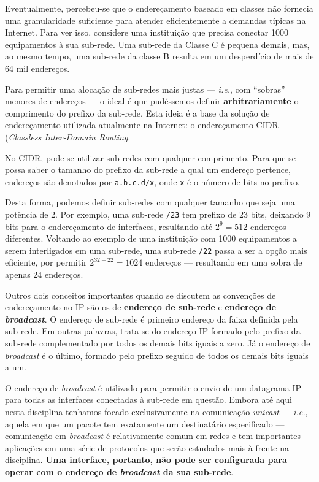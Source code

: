 \documentclass{article}
\begin{document}
Eventualmente, percebeu-se que o endereçamento baseado em classes não fornecia uma granularidade suficiente para atender eficientemente a demandas típicas na Internet. Para ver isso, considere uma instituição que precisa conectar 1000 equipamentos à sua sub-rede. Uma sub-rede da Classe C é pequena demais, mas, ao mesmo tempo, uma sub-rede da classe B resulta em um desperdício de mais de 64 mil endereços.

Para permitir uma alocação de sub-redes mais justas --- \textit{i.e.}, com ``sobras'' menores de endereços --- o ideal é que pudéssemos definir \textbf{arbitrariamente} o comprimento do prefixo da sub-rede. Esta ideia é a base da solução de endereçamento utilizada atualmente na Internet: o endereçamento CIDR (\textit{Classless Inter-Domain Routing}.

No CIDR, pode-se utilizar sub-redes com qualquer comprimento. Para que se possa saber o tamanho do prefixo da sub-rede a qual um endereço pertence, endereços são denotados por \texttt{a.b.c.d/x}, onde \texttt{x} é o número de bits no prefixo.

Desta forma, podemos definir sub-redes com qualquer tamanho que seja uma potência de 2. Por exemplo, uma sub-rede \texttt{/23} tem prefixo de 23 bits, deixando 9 bits para o endereçamento de interfaces, resultando até $2^{9} = 512$ endereços diferentes. Voltando ao exemplo de uma instituição com 1000 equipamentos a serem interligados em uma sub-rede, uma sub-rede \texttt{/22} passa a ser a opção mais eficiente, por permitir $2^{32-22} = 1024$ endereços --- resultando em uma sobra de apenas 24 endereços.

Outros dois conceitos importantes quando se discutem as convenções de endereçamento no IP são os de \textbf{endereço de sub-rede} e \textbf{endereço de \textit{broadcast}}. O endereço de sub-rede é primeiro endereço da faixa definida pela sub-rede. Em outras palavras, trata-se do endereço IP formado pelo prefixo da sub-rede complementado por todos os demais bits iguais a zero. Já o endereço de \textit{broadcast} é o último, formado pelo prefixo seguido de todos os demais bits iguais a um.

O endereço de \textit{broadcast} é utilizado para permitir o envio de um datagrama IP para todas as interfaces conectadas à sub-rede em questão. Embora até aqui nesta disciplina tenhamos focado exclusivamente na comunicação \textit{unicast} --- \textit{i.e.}, aquela em que um pacote tem exatamente um destinatário especificado --- comunicação em \textit{broadcast} é relativamente comum em redes e tem importantes aplicações em uma série de protocolos que serão estudados mais à frente na disciplina. \textbf{Uma interface, portanto, não pode ser configurada para operar com o endereço de \textit{broadcast} da sua sub-rede}.
\end{document}
